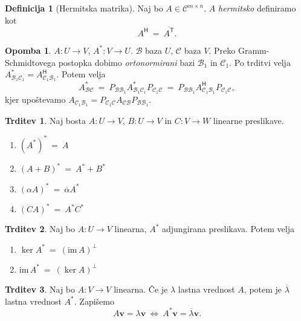 \documentclass[11pt]{article}
\newcommand{\vv}{\mathbf{v}}
\newcommand{\0}{\mathbf{0}}
\newcommand{\im}{\text{im}\,}
\newcommand{\B}{\mathscr{B}}
\newcommand{\C}{\mathscr{C}}
\newcommand{\T}{\mathsf{T}}
\renewcommand{\H}{\mathsf{H}}
\theoremstyle{definition}
\newtheorem{definicija}{Definicija}[section]
\theoremstyle{definition}
\newtheorem{trditev}{Trditev}[section]
\theoremstyle{definition}
\theoremstyle{definition}
\newtheorem*{opomba}{Opomba}
\begin{document}
\begin{definicija}[Hermitska matrika]

Naj bo $A \in \C^{m \times n}$. $A$ \textit{hermitsko} definiramo kot
$$A^\H ~=~ \overline{A^\T}.$$

\end{definicija}
\vspace{0.5cm}

\begin{opomba}

$A: U \rightarrow V$, $A^*: V \rightarrow U$. $\B$ baza $U$, $\C$ baza $V$. Preko Gramm-Schmidtovega postopka dobimo \textit{ortonormirani} bazi $\B_1$ in $\C_1$. Po trditvi velja $A_{\B_1\C_1}^* = A_{\C_1\B_1}^\H$. Potem velja
$$A_{\B\C}^* ~=~ P_{\B\B_1} A_{\B_1\C_1}^* P_{\C_1\C} ~=~ P_{\B\B_1} A_{\C_1\B_1}^\H P_{\C_1\C},$$
kjer upoštevamo $A_{\C_1\B_1} = P_{\C_1\C} A_{\C\B} P_{\B\B_1}$.

\end{opomba}
\vspace{0.5cm}

\begin{trditev}

Naj bosta $A: U \rightarrow V$, $B: U \rightarrow V$ in $C: V \rightarrow W$ linearne preslikave.
\begin{enumerate}
	\item $(A^*)^* ~=~ A$
	\item $(A+B)^* ~=~ A^* + B^*$
	\item $(\alpha A)^* ~=~ \overline{\alpha}A^*$
	\item $(CA)^* ~=~ A^*C^*$
\end{enumerate}

\end{trditev}
\vspace{0.5cm}

\begin{trditev}

Naj bo $A: U \rightarrow V$ linearna, $A^*$ adjungirana preslikava. Potem velja
\begin{enumerate}
	\item $\ker A^* ~=~ (\im A)^\perp$
	\item $\im A^* ~=~ (\ker A)^\perp$
\end{enumerate}

\end{trditev}
\vspace{0.5cm}

\begin{trditev}

Naj bo $A: V \rightarrow V$ linearna. Če je $\lambda$ lastna vrednost $A$, potem je $\overline{\lambda}$ lastna vrednost $A^*$. Zapišemo
$$A\vv = \lambda\vv ~\iff~ A^*\vv = \overline{\lambda}\vv.$$ 

\end{trditev}
\vspace{0.5cm}
\end{document}
